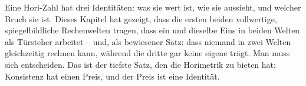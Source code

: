 \begin{oberflaeche}
Eine Hori-Zahl hat drei Identitäten: was sie wert ist, wie sie
aussieht, und welcher Bruch sie ist. Dieses Kapitel hat gezeigt,
dass die ersten beiden vollwertige, spiegelbildliche Rechenwelten
tragen, dass ein und dieselbe Eins in beiden Welten als Türsteher
arbeitet -- und, als bewiesener Satz: dass niemand in zwei Welten
gleichzeitig rechnen kann, während die dritte gar keine eigene
trägt. Man muss sich entscheiden. Das ist der tiefste Satz, den die
Horimetrik zu bieten hat: Konsistenz hat einen Preis, und der Preis
ist eine Identität.
\end{oberflaeche}
